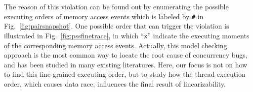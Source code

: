 \documentclass[runningheads]{llncs}
\begin{document}

The reason of this violation can be found out by enumerating the possible executing orders of memory access events which is labeled by \texttt{\#} in Fig.~\ref{fig:pairsnapshot}. 
One possible order that can trigger the violation is illustrated in Fig.~\ref{fig:pssfinetrace}, in which ``\texttt{x}'' indicate the executing moments of the corresponding memory access events. 
Actually, this model checking approach is the most common way to locate the root cause of concurrency bugs, and has been studied in many existing literatures.
Here, our focus is not on how to find this fine-grained executing order, but to study how the thread execution order, which causes data race, influences the final result of linearizability.

\end{document}
